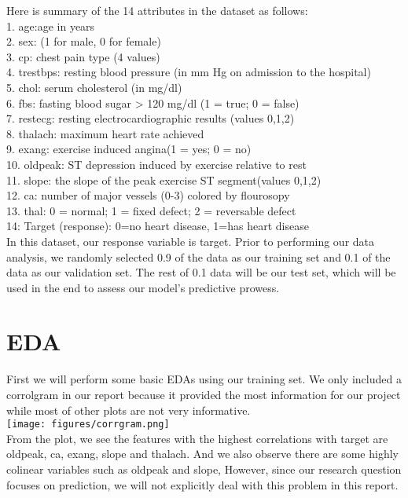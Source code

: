 \documentclass{article}
\begin{document}
Here is summary of the 14 attributes in the dataset as follows: \\
1. age:age in years  \\
2. sex: (1 for male, 0 for female)  \\
3. cp: chest pain type (4 values)  \\
4. trestbps: resting blood pressure (in mm Hg on admission to the hospital)  \\
5. chol: serum cholesterol (in mg/dl)  \\
6. fbs: fasting blood sugar > 120 mg/dl (1 = true; 0 = false)  \\
7. restecg: resting electrocardiographic results (values 0,1,2)  \\
8. thalach: maximum heart rate achieved  \\
9. exang: exercise induced angina(1 = yes; 0 = no)  \\
10. oldpeak: ST depression induced by exercise relative to rest  \\
11. slope: the slope of the peak exercise ST segment(values 0,1,2)  \\
12. ca: number of major vessels (0-3) colored by flourosopy  \\
13. thal: 0 = normal; 1 = fixed defect; 2 = reversable defect  \\
14: Target (response): 0=no heart disease, 1=has heart disease  \\


In this dataset, our response variable is target. Prior to performing our data
analysis, we randomly selected 0.9 of the data as our training set and 0.1 of
the data as our validation set. The rest of 0.1 data will be our test set,
which will be used in the end to assess our model's predictive prowess.  \\

\section{EDA}
First we will perform some basic EDAs using our training set. We only included
a corrolgram in our report because it provided the most information for
our project while most of other plots are not very informative. \\

\texttt{[image: figures/corrgram.png]}\\

From the plot, we see the features with the highest correlations with target
are oldpeak, ca, exang, slope and thalach. And we also observe
there are some highly colinear variables such as oldpeak and slope,
However, since our research question focuses on prediction,
we will not explicitly deal with this problem in this report. \\
\end{document}
